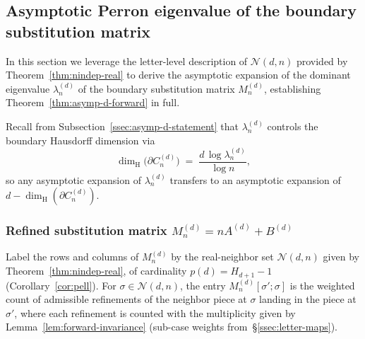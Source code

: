 \documentclass{amsart}
\theoremstyle{definition}
\theoremstyle{remark}
\newcommand{\dH}{\dim_{\mathrm{H}}}
\begin{document}




\subsection{Asymptotic Perron eigenvalue of the boundary substitution matrix}
\label{sec:asymp}

In this section we leverage the letter-level description of
$\mathcal{N}(d, n)$ provided by
Theorem~\ref{thm:nindep-real} to derive the
asymptotic expansion of the dominant eigenvalue
$\lambda_n^{(d)}$ of the boundary substitution matrix
$M_n^{(d)}$, establishing Theorem~\ref{thm:asymp-d-forward}
in full.

Recall from Subsection~\ref{ssec:asymp-d-statement} that
$\lambda_n^{(d)}$ controls the boundary Hausdorff dimension via
\[
  \dH\bigl(\partial C_n^{(d)}\bigr)
    \;=\; \frac{d\,\log \lambda_n^{(d)}}{\log n},
\]
so any asymptotic expansion of $\lambda_n^{(d)}$ transfers to an
asymptotic expansion of $d - \dH(\partial C_n^{(d)})$.

\subsubsection{Refined substitution matrix $M_n^{(d)} = n A^{(d)} + B^{(d)}$}
\label{sec:Mn-decomp}

Label the rows and columns of $M_n^{(d)}$ by the real-neighbor set
$\mathcal{N}(d, n)$ given by
Theorem~\ref{thm:nindep-real}, of cardinality
$p(d) = H_{d+1} - 1$ (Corollary~\ref{cor:pell}).
For $\sigma \in \mathcal{N}(d, n)$, the entry
$M_n^{(d)}[\sigma'; \sigma]$ is the weighted count of admissible
refinements of the neighbor piece at $\sigma$ landing in the
piece at $\sigma'$, where each refinement is counted with the
multiplicity given by Lemma~\ref{lem:forward-invariance}
(sub-case weights from~\S\ref{ssec:letter-maps}).
\end{document}
